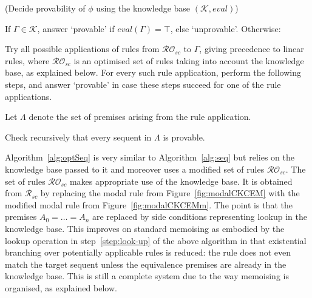 \documentclass{entcs} \usepackage{entcsmacro}
\newcommand{\eval}{\mathit{eval}}
\begin{document}
\begin{alg}\label{alg:opt}
  (Decide provability of $\phi$ using the knowledge
  base $(\mathcal{K},\eval)$)
{\upshape
 \begin{algenumerate}
 \item\label{step:look-up} If $\Gamma\in\mathcal{K}$, answer `provable' if
   $\eval(\Gamma)=\top$, else `unprovable'. Otherwise:
 \item\label{step:rule} Try all possible applications of rules from
   $\mathcal{RO}_{sc}$ to $\Gamma$, giving precedence to linear rules,
   where $\mathcal{RO}_{sc}$ is an optimised set of rules taking into
   account the knowledge base, as explained below. For every such rule
   application, perform the following steps, and answer `provable' in
   case these steps succeed for one of the rule applications.
   \item Let $\Lambda$ denote the  set of premises  arising from the rule 
     application.
   \item Check recursively that every sequent in $\Lambda$ is provable.
  \end{algenumerate}
}
\label{alg:optSeq}
\end{alg}

\noindent Algorithm~\ref{alg:optSeq} is very similar to
Algorithm~\ref{alg:seq} but relies on the knowledge base passed to it
and moreover uses a modified set of rules $\mathcal{RO}_{sc}$. The set
of rules $\mathcal{RO}_{sc}$ makes appropriate use of the knowledge
base. It is obtained from $\mathcal{R}_{sc}$ by replacing the modal
rule from Figure~\ref{fig:modalCKCEM} with the modified modal rule
from Figure~\ref{fig:modalCKCEMm}. The point is that the premises
$A_0=\dots=A_n$ are replaced by side conditions representing lookup in
the knowledge base. This improves on standard memoising as embodied by
the lookup operation in step~\ref{step:look-up} of the above algorithm
in that existential branching over potentially applicable rules is
reduced: the rule does not even match the target sequent unless the
equivalence premises are already in the knowledge base. This is still
a complete system due to the way memoising is organised, as explained
below.
\end{document}
